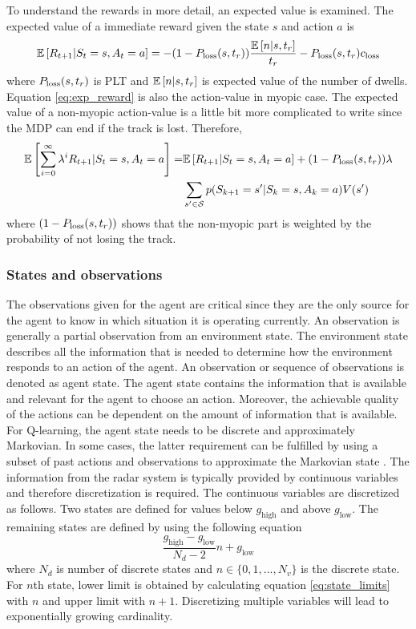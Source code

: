 \documentclass[english, 12pt, a4paper, elec, utf8, a-1b, online]{aaltothesis}
\newcommand{\Ss}{\mathcal{S}}
\newcommand{\E}[1]{\mathbb{E}\left[ #1 \right]}
\newcommand{\closs}{c_\text{loss}}
\begin{document}
To understand the rewards in more detail, an expected value is examined.
The expected value of a immediate reward given the state $s$ and action $a$ is
\begin{equation}\label{eq:exp_reward}
    \E{R_{t+1} | S_t=s, A_t=a} = -(1-\ploss(s, t_r)) 
        \frac
        {
            \mathbb{E} \left[ n | s, t_r \right]
        }
        {
        \ri
        } 
        - \ploss(s, t_r) \closs
\end{equation}
where $P_\text{loss}(s, t_r)$ is PLT and $\E{n|s, \ri}$ is expected value of the number of dwells.
Equation \eqref{eq:exp_reward} is also the action-value in myopic case.
The expected value of a non-myopic action-value is a little bit more complicated to write since the MDP can end if the track is lost.
Therefore, 
\begin{align}
    \E{\sum_{i=0}^\infty \lambda^i R_{t+1} | S_t=s, A_t=a} =& \E{R_{t+1} | S_t=s, A_t=a} + (1-\ploss(s, t_r)) \lambda \\
    & \sum_{s'\in \Ss} p(S_{k+1}=s'|S_{k}=s, A_{k}=a)  V(s')  
\end{align}
where $(1-P_\text{loss}(s, t_r))$ shows that the non-myopic part is weighted by the probability of not losing the track.

\subsubsection{States and observations} \label{sec:states}

\newcommand{\glow}{g_\text{low}}
\newcommand{\ghigh}{g_\text{high}}

The observations given for the agent are critical since they are the only source for the agent to know in which situation it is operating currently.
An observation is generally a partial observation from an environment state.
The environment state describes all the information that is needed to determine how the environment responds to an action of the agent. 
An observation or sequence of observations is denoted as agent state.
The agent state contains the information that is available and relevant for the agent to choose an action.
Moreover, the achievable quality of the actions can be dependent on the amount of information that is available. 
For Q-learning, the agent state needs to be discrete and approximately Markovian.
In some cases, the latter requirement can be fulfilled by using a subset of past actions and observations to approximate the Markovian state \cite{Mnih2013}.
The information from the radar system is typically provided by continuous variables and therefore discretization is required.
The continuous variables are discretized as follows. 
Two states are defined for values below $\ghigh$ and above $\glow$. 
The remaining states are defined by using the following equation 
\begin{equation}\label{eq:state_limits}
    \frac{\ghigh - \glow}{N_d - 2} n + \glow
\end{equation}
where $N_d$ is number of discrete states and $n \in \{0, 1, ..., N_v\}$ is the discrete state.
For $n$th state, lower limit is obtained by calculating equation \eqref{eq:state_limits} with $n$ and upper limit with $n+1$.
Discretizing multiple variables will lead to exponentially growing cardinality.
\end{document}
